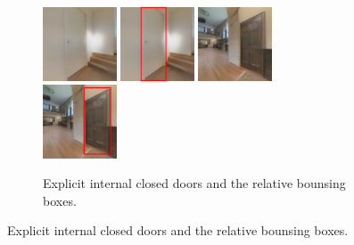 \begin{figure}[h!]
	\begin{subfigure}[b]{\linewidth}
		\centering
		\includegraphics[width=0.24\textwidth]{images/explicitinternalclosed1.png}
		\hfill
		\includegraphics[width=0.24\textwidth]{images/explicitinternalclosed1boxed.png}
		\includegraphics[width=0.24\textwidth]{images/explicitinternalclosed2.png}
		\hfill
		\includegraphics[width=0.24\textwidth]{images/explicitinternalclosed2boxed.png}
		\caption{Explicit internal closed doors and the relative bounsing boxes.}	
	\end{subfigure}
	

\end{figure}
